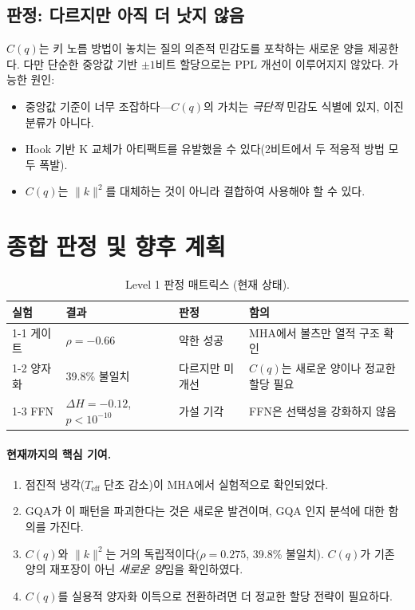 \documentclass[11pt,a4paper]{article}
\begin{document}
\subsection{판정: \textcolor{partial}{다르지만 아직 더 낫지 않음}}

$C(q)$는 키 노름 방법이 놓치는 질의 의존적 민감도를 포착하는 새로운 양을 제공한다. 다만 단순한 중앙값 기반 $\pm1$비트 할당으로는 PPL 개선이 이루어지지 않았다. 가능한 원인:
\begin{itemize}[nosep]
  \item 중앙값 기준이 너무 조잡하다---$C(q)$의 가치는 \textit{극단적} 민감도 식별에 있지, 이진 분류가 아니다.
  \item Hook 기반 K 교체가 아티팩트를 유발했을 수 있다(2비트에서 두 적응적 방법 모두 폭발).
  \item $C(q)$는 $\|k\|^2$를 대체하는 것이 아니라 결합하여 사용해야 할 수 있다.
\end{itemize}

\section{종합 판정 및 향후 계획}

\begin{table}[H]
\centering
\caption{Level 1 판정 매트릭스 (현재 상태).}
\begin{tabularx}{\textwidth}{lll>{\raggedright\arraybackslash}X}
\toprule
\textbf{실험} & \textbf{결과} & \textbf{판정} & \textbf{함의} \\
\midrule
1-1 게이트 & $\rho=-0.66$ & \textcolor{partial}{약한 성공} & MHA에서 볼츠만 열적 구조 확인 \\
1-2 양자화 & 39.8\% 불일치 & \textcolor{partial}{다르지만 미개선} & $C(q)$는 새로운 양이나 정교한 할당 필요 \\
1-3 FFN & $\Delta H=-0.12$, $p<10^{-10}$ & \textcolor{failure}{가설 기각} & FFN은 선택성을 강화하지 않음 \\
\bottomrule
\end{tabularx}
\end{table}

\paragraph{현재까지의 핵심 기여.}
\begin{enumerate}[nosep]
  \item 점진적 냉각($T_\mathrm{eff}$ 단조 감소)이 MHA에서 실험적으로 확인되었다.
  \item GQA가 이 패턴을 파괴한다는 것은 새로운 발견이며, GQA 인지 분석에 대한 함의를 가진다.
  \item $C(q)$와 $\|k\|^2$는 거의 독립적이다($\rho=0.275$, 39.8\% 불일치). $C(q)$가 기존 양의 재포장이 아닌 \textit{새로운 양}임을 확인하였다.
  \item $C(q)$를 실용적 양자화 이득으로 전환하려면 더 정교한 할당 전략이 필요하다.
\end{enumerate}
\end{document}
